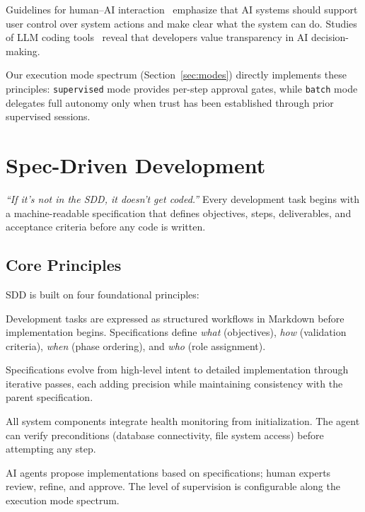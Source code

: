 \documentclass[11pt,letterpaper]{article}
\begin{document}
Guidelines for human--AI interaction~\cite{amershi2019guidelines}
emphasize that AI systems should support user control over system
actions and make clear what the system can do.
Studies of LLM coding tools~\cite{vaithilingam2022expectation} reveal
that developers value transparency in AI decision-making.

Our execution mode spectrum (Section~\ref{sec:modes}) directly implements
these principles: \texttt{supervised} mode provides per-step approval
gates, while \texttt{batch} mode delegates full autonomy only when trust
has been established through prior supervised sessions.

\section{Spec-Driven Development}
\label{sec:sdd}

\begin{definition}
\emph{``If it's not in the SDD, it doesn't get coded.''}
Every development task begins with a machine-readable specification that
defines objectives, steps, deliverables, and acceptance criteria before
any code is written.
\end{definition}

\subsection{Core Principles}

SDD is built on four foundational principles:

\begin{description}[nosep,leftmargin=1.5em]
    \item[P1: Specifications as First-Class Artifacts.]
    Development tasks are expressed as structured workflows in Markdown
    before implementation begins.  Specifications define \emph{what}
    (objectives), \emph{how} (validation criteria), \emph{when}
    (phase ordering), and \emph{who} (role assignment).

    \item[P2: Progressive Refinement.]
    Specifications evolve from high-level intent to detailed
    implementation through iterative passes, each adding precision
    while maintaining consistency with the parent specification.

    \item[P3: Health-Integrated Architecture.]
    All system components integrate health monitoring from initialization.
    The agent can verify preconditions (database connectivity, file
    system access) before attempting any step.

    \item[P4: Supervised Human--AI Collaboration.]
    AI agents propose implementations based on specifications; human
    experts review, refine, and approve.  The level of supervision is
    configurable along the execution mode spectrum.
\end{description}
\end{document}
